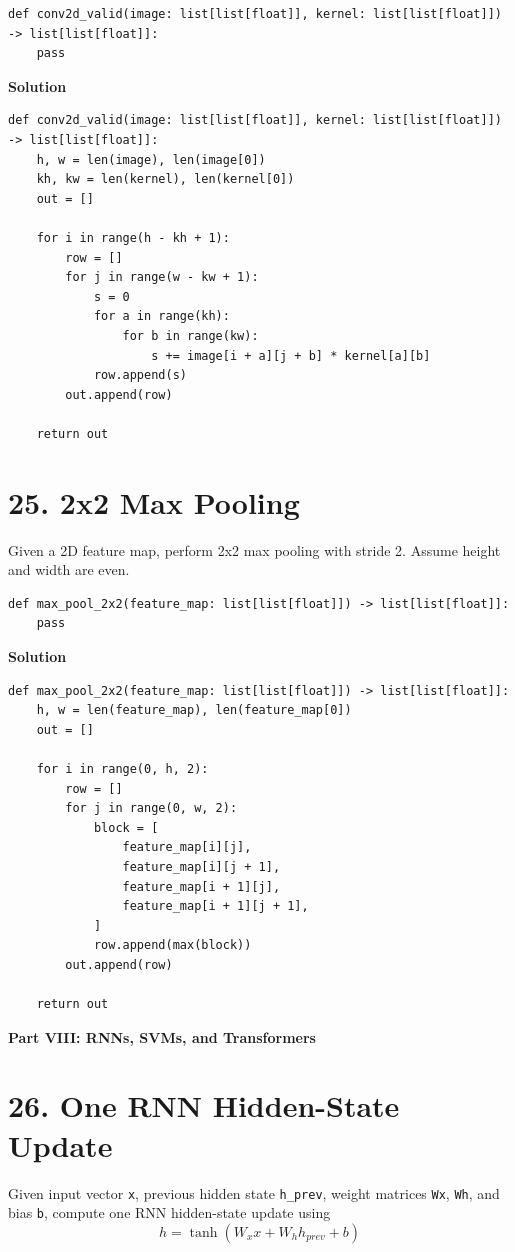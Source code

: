 \documentclass[11pt]{article}
\begin{document}
\begin{lstlisting}
def conv2d_valid(image: list[list[float]], kernel: list[list[float]]) -> list[list[float]]:
    pass
\end{lstlisting}

\medskip
\noindent\textbf{Solution}
\begin{lstlisting}
def conv2d_valid(image: list[list[float]], kernel: list[list[float]]) -> list[list[float]]:
    h, w = len(image), len(image[0])
    kh, kw = len(kernel), len(kernel[0])
    out = []

    for i in range(h - kh + 1):
        row = []
        for j in range(w - kw + 1):
            s = 0
            for a in range(kh):
                for b in range(kw):
                    s += image[i + a][j + b] * kernel[a][b]
            row.append(s)
        out.append(row)

    return out
\end{lstlisting}

\section*{25. 2x2 Max Pooling}
Given a 2D feature map, perform 2x2 max pooling with stride 2. Assume height and width are even.

\begin{lstlisting}
def max_pool_2x2(feature_map: list[list[float]]) -> list[list[float]]:
    pass
\end{lstlisting}

\medskip
\noindent\textbf{Solution}
\begin{lstlisting}
def max_pool_2x2(feature_map: list[list[float]]) -> list[list[float]]:
    h, w = len(feature_map), len(feature_map[0])
    out = []

    for i in range(0, h, 2):
        row = []
        for j in range(0, w, 2):
            block = [
                feature_map[i][j],
                feature_map[i][j + 1],
                feature_map[i + 1][j],
                feature_map[i + 1][j + 1],
            ]
            row.append(max(block))
        out.append(row)

    return out
\end{lstlisting}

\vspace{0.75em}
\noindent\textbf{\large Part VIII: RNNs, SVMs, and Transformers}
\vspace{0.5em}

\section*{26. One RNN Hidden-State Update}
Given input vector \texttt{x}, previous hidden state \texttt{h\_prev}, weight matrices \texttt{Wx}, \texttt{Wh}, and bias \texttt{b}, compute one RNN hidden-state update using
\[
h = \tanh(W_x x + W_h h_{prev} + b)
\]
\end{document}
